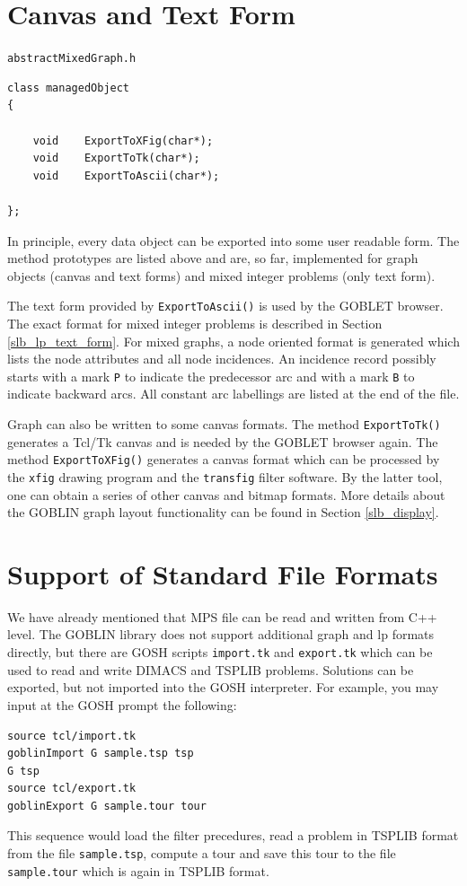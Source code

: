 \documentclass[a4paper,11pt,twoside]{book}
\begin{document}
\begin{multicols}{2}
\section{Canvas and Text Form}
\label{slb_viz_formats}
\myinclude\verb/abstractMixedGraph.h/
\begin{mymethods}
\begin{verbatim}
class managedObject
{

    void    ExportToXFig(char*);
    void    ExportToTk(char*);
    void    ExportToAscii(char*);

};
\end{verbatim}
\end{mymethods}
In principle, every data object can be exported into some user readable form.
The method prototypes are listed above and are, so far, implemented for graph
objects (canvas and text forms) and mixed integer problems (only text form).

The text form provided by \verb/ExportToAscii()/ is used by the GOBLET browser.
The exact format for mixed integer problems is described in Section
\ref{slb_lp_text_form}. For mixed graphs, a node oriented format is generated
which lists the node attributes and all node incidences. An incidence record
possibly starts with a mark \verb/P/ to indicate the predecessor arc and with
a mark \verb/B/ to indicate backward arcs. All constant arc labellings are
listed at the end of the file.

Graph can also be written to some canvas formats. The method \verb/ExportToTk()/
generates a Tcl/Tk canvas and is needed by the GOBLET browser again. The
method \verb/ExportToXFig()/ generates a canvas format which can be processed
by the \verb/xfig/ drawing program and the \verb/transfig/ filter software.
By the latter tool, one can obtain a series of other canvas and bitmap formats.
More details about the GOBLIN graph layout functionality can be found in
Section \ref{slb_display}.


\section{Support of Standard File Formats}
\label{slb_standard_formats}
We have already mentioned that MPS file can be read and written from C++ level.
The GOBLIN library does not support additional graph and lp formats directly,
but there are GOSH scripts \verb/import.tk/ and \verb/export.tk/ which can be
used to read and write DIMACS and TSPLIB problems. Solutions can be exported,
but not imported into the GOSH interpreter. For example, you may input at the
GOSH prompt the following:
\begin{mysample}
\begin{verbatim}
source tcl/import.tk
goblinImport G sample.tsp tsp
G tsp
source tcl/export.tk
goblinExport G sample.tour tour
\end{verbatim}
\end{mysample}
This sequence would load the filter precedures, read a problem in TSPLIB format
from the file \verb/sample.tsp/, compute a tour and save this tour to the file
\verb/sample.tour/ which is again in TSPLIB format.


\end{multicols}
\end{document}
